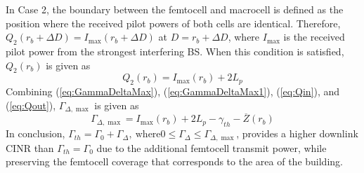 \documentclass[draftclsnofoot,12pt,onecolumn]{IEEEtran}
\begin{document}
In Case 2, the boundary between the femtocell and macrocell is
defined as the position where the received pilot powers of both
cells are identical. Therefore, $Q_{2}(r_b+\Delta
D)=I_{\max}(r_b+\Delta D)$ at $D=r_b+\Delta D$, where $I_{\max}$ is
the received pilot power from the strongest interfering BS. When
this condition is satisfied, $Q_{2}(r_b)$ is given as
\begin{equation}
Q_{2}(r_b)=I_{\max}(r_b)+2L_p\label{eq:Qout}
\end{equation}
Combining (\ref{eq:GammaDeltaMax}), (\ref{eq:GammaDeltaMax1}), (\ref{eq:Qin}), and (\ref{eq:Qout}),
$\Gamma_{\Delta,\max}$ is given as
\begin{equation}
\Gamma_{\Delta,\max}=I_{\max}(r_b)+2L_p-\gamma_{th}-\overline{Z}(r_b)
\label{eq:mu_th}
\end{equation}
In conclusion, $\Gamma_{th}=\Gamma_0+\Gamma_{\Delta},~\textrm{where
} 0\leq \Gamma_{\Delta} \leq\Gamma_{\Delta,\max}$, provides a higher
downlink CINR than $\Gamma_{th}=\Gamma_0$ due to the additional
femtocell transmit power, while preserving the femtocell coverage
that corresponds to the area of the building.
\end{document}
